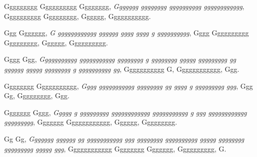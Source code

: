 \documentclass[conference]{IEEEtran}
\begin{document}
\begin{thebibliography}{9}
 Ggggggggg Gggggggggg Gggggggg, \emph{Ggggggg gggggggg gggggggggg gggggggggggg}, Gggggggggg Ggggggggg, Gggggg, Ggggggggggg.

 Ggg Ggggggg, \emph{G gggggggggggg gggggg gggg gggg g gggggggggg}, Gggg Gggggggggg Ggggggggg, Gggggg, Gggggggggg.

 Gggg Ggg, \emph{Ggggggggggg ggggggggggg gggggggg g gggggggg ggggg ggggggggg gg gggggg ggggg gggggggg g gggggggggg gg}, Ggggggggggg G, Gggggggggggg, Ggg.

 Gggggggg Ggggggggggg, \emph{Gggg ggggggggggg gggggggg gg gggg g ggggggggg ggg}, Ggg Gg, Ggggggggg, Ggg.

 Ggggggg Gggg, \emph{Ggggg g ggggggggg gggggggggggg ggggggggggg g ggg gggggggggggg ggggggggg}, Ggggggg Gggggggggggg, Gggggg, Ggggggggg.

 Gg Gg, \emph{Ggggggg gggggg gg ggggggggggg ggg gggggggg gggggggggg ggggg gggggggg ggggggggg ggggg ggg}, Gggggggggggg Gggggggg Ggggggg, Gggggggggg, G.

\end{thebibliography}
\end{document}
